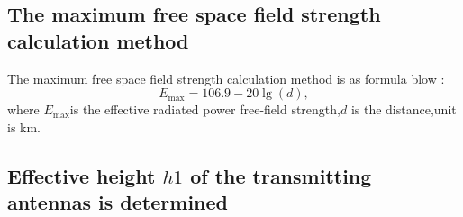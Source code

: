 \documentclass[12pt,a4paper,twocolumn,fleqn]{narms}
\begin{document}
\subsection{The maximum free space field strength calculation method}

The maximum free space field strength calculation method is as formula blow
: \begin{equation}
{E_{\max }} = 106.9 - 20\lg (d), \label{keurough} \end{equation} where
${E_{\max }} $is the effective radiated power free-field strength,$d$ is the distance,unit is km.

\subsection{Effective height $h1$ of the transmitting antennas is determined}
\end{document}
